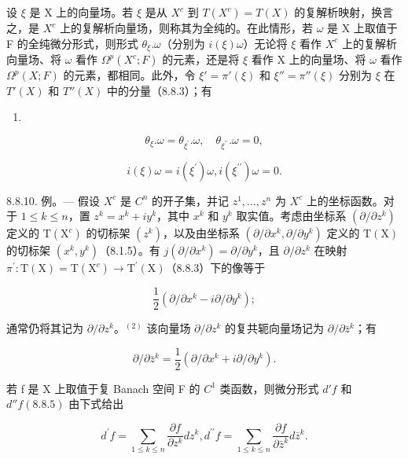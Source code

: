 设 \(\xi\) 是 X 上的向量场。若 \(\xi\) 是从 \(X^c\) 到 \(T(X^c) = T(X)\) 的复解析映射，换言之，是 \(X^c\) 上的复解析向量场，则称其为全纯的。在此情形，若 \(\omega\) 是 X 上取值于 F 的全纯微分形式，则形式 \(\theta_{\xi}.\omega\)（分别为 \(i(\xi)\omega\)）无论将 \(\xi\) 看作 \(X^c\) 上的复解析向量场、将 \(\omega\) 看作 \(\Omega^p(X^c; F)\) 的元素，还是将 \(\xi\) 看作 X 上的向量场、将 \(\omega\) 看作 \(\Omega^p(X; F)\) 的元素，都相同。此外，令 \(\xi' = \pi'(\xi)\) 和 \(\xi'' = \pi''(\xi)\) 分别为 \(\xi\) 在 \(T'(X)\) 和 \(T''(X)\) 中的分量（8.8.3）；有

\begin{enumerate}
\def\labelenumi{(\arabic{enumi})}
\setcounter{enumi}{6}
\tightlist
\item
\end{enumerate}
\[
\theta_ {\xi}. \omega = \theta_ {\xi^ {\prime}}. \omega , \quad \theta_ {\xi^ {\prime \prime}}. \omega = 0,\tag{7}
\]

\[
i (\xi) \omega = i (\xi^ {\prime}) \omega , i (\xi^ {\prime \prime}) \omega = 0.\tag{8}
\]

8.8.10. 例。--- 假设 \(X^{c}\) 是 \(C^{n}\) 的开子集，并记 \(z^{1},\ldots,z^{n}\) 为 \(X^{c}\) 上的坐标函数。对于 \(1\leqslant k\leqslant n\)，置 \(z^{k}=x^{k}+iy^{k}\)，其中 \(x^{k}\) 和 \(y^{k}\) 取实值。考虑由坐标系 \((\partial/\partial z^{k})\) 定义的 \(\mathrm{T}(\mathrm{X}^{c})\) 的切标架 \((z^{k})\)，以及由坐标系 \((\partial/\partial x^{k},\partial/\partial y^{k})\) 定义的 \(\mathrm{T}(\mathrm{X})\) 的切标架 \((x^{k},y^{k})\)（8.1.5）。有 \(j(\partial/\partial x^{k})=\partial/\partial y^{k}\)，且 \(\partial/\partial z^{k}\) 在映射 \(\pi^{\prime}\colon\mathrm{T}(\mathrm{X})=\mathrm{T}(\mathrm{X}^{c})\to\mathrm{T}^{\prime}(\mathrm{X})\)（8.8.3）下的像等于

\[
\frac {1}{2} (\partial / \partial x ^ {k} - i \partial / \partial y ^ {k});
\]

通常仍将其记为 \(\partial/\partial z^{k}\)。\(^{(2)}\) 该向量场 \(\partial/\partial z^{k}\) 的复共轭向量场记为 \(\partial/\partial\bar{z}^{k}\)；有

\[
\partial / \partial \bar {z} ^ {k} = \frac {1}{2} (\partial / \partial x ^ {k} + i \partial / \partial y ^ {k}).\tag{9}
\]

若 f 是 X 上取值于复 Banach 空间 F 的 \(C^{1}\) 类函数，则微分形式 \(d'f\) 和 \(d''f(8.8.5)\) 由下式给出

\[
d ^ {\prime} f = \sum_ {1 \leqslant k \leqslant n} \frac {\partial f}{\partial z ^ {k}} d z ^ {k}, d ^ {\prime \prime} f = \sum_ {1 \leqslant k \leqslant n} \frac {\partial f}{\partial \bar {z} ^ {k}} d \bar {z} ^ {k}.\tag{10}
\]

